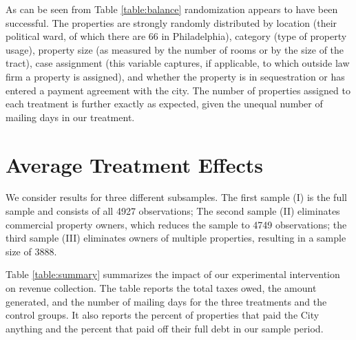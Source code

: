\documentclass[12pt,titlepage]{article}
\begin{document}
As can be seen from Table \ref{table:balance} randomization appears to
have been successful.  The properties are strongly randomly
distributed by location (their political ward, of which there are 66
in Philadelphia), category (type of property usage), property size (as
measured by the number of rooms or by the size of the tract), case
assignment (this variable captures, if applicable, to which outside
law firm a property is assigned), and whether the property is in
sequestration or has entered a payment agreement with the city. The
number of properties assigned to each treatment is further exactly as
expected, given the unequal number of mailing days in our treatment.


\section{Average Treatment Effects}


We consider results for three different subsamples.  The first sample
(I) is the full sample and consists of all 4927 observations; The
second sample (II) eliminates commercial property owners, which
reduces the sample to 4749 observations; the third sample (III)
eliminates owners of multiple properties, resulting in a sample size
of 3888.

Table \ref{table:summary} summarizes the impact of our experimental
intervention on revenue collection.  The table reports the total
taxes owed, the amount generated, and the number of mailing days for
the three treatments and the control groups. It also reports the
percent of properties that paid the City anything and the percent that
paid off their full debt in our sample period.
\end{document}
